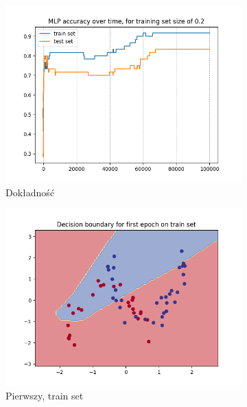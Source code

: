 \documentclass[12pt]{article}
\newcommand*{\subfigwidth}{0.24\textwidth}
\begin{document}
\begin{figure}[H]\centering
    \begin{subfigure}[t]{\subfigwidth}
        \includegraphics[width=\linewidth]{img/exp_4/set_0.2/accuracies.png}
        \caption{Dokładność}
    \end{subfigure}
    \hfill
    \begin{subfigure}[t]{\subfigwidth}
        \includegraphics[width=\linewidth]{img/exp_4/set_0.2/first/train_boundary.png}
        \caption{Pierwszy, train set}
    \end{subfigure}
    \hfill
    \begin{subfigure}[t]{\subfigwidth}

\end{subfigure}
\end{figure}
\end{document}
